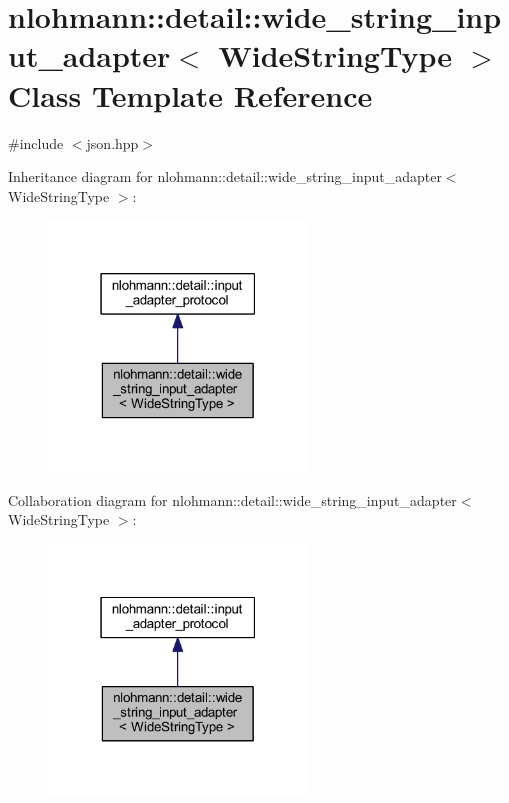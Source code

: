 \hypertarget{classnlohmann_1_1detail_1_1wide__string__input__adapter}{}\section{nlohmann\+::detail\+::wide\+\_\+string\+\_\+input\+\_\+adapter$<$ Wide\+String\+Type $>$ Class Template Reference}
\label{classnlohmann_1_1detail_1_1wide__string__input__adapter}


{\ttfamily \#include $<$json.\+hpp$>$}



Inheritance diagram for nlohmann\+::detail\+::wide\+\_\+string\+\_\+input\+\_\+adapter$<$ Wide\+String\+Type $>$\+:
\nopagebreak
\begin{figure}[H]
\begin{center}
\leavevmode
\includegraphics[width=195pt]{classnlohmann_1_1detail_1_1wide__string__input__adapter__inherit__graph}
\end{center}
\end{figure}


Collaboration diagram for nlohmann\+::detail\+::wide\+\_\+string\+\_\+input\+\_\+adapter$<$ Wide\+String\+Type $>$\+:
\nopagebreak
\begin{figure}[H]
\begin{center}
\leavevmode
\includegraphics[width=195pt]{classnlohmann_1_1detail_1_1wide__string__input__adapter__coll__graph}
\end{center}
\end{figure}
